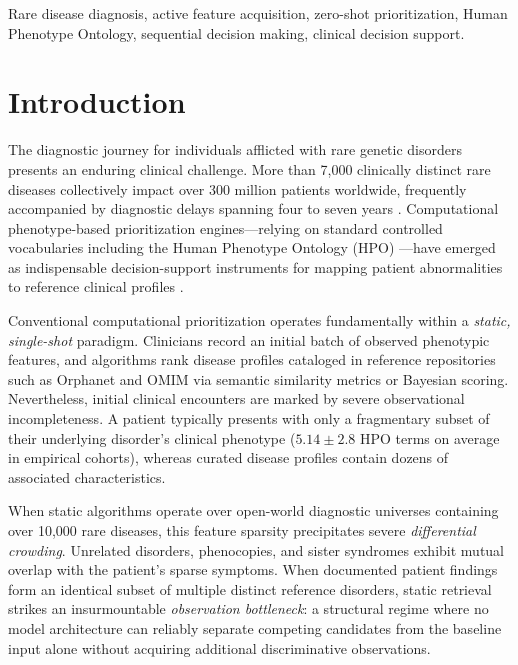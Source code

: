 \documentclass[conference]{IEEEtran}
\begin{document}
\begin{IEEEkeywords}
Rare disease diagnosis, active feature acquisition, zero-shot prioritization, Human Phenotype Ontology, sequential decision making, clinical decision support.
\end{IEEEkeywords}

\section{Introduction}

The diagnostic journey for individuals afflicted with rare genetic disorders presents an enduring clinical challenge. More than 7,000 clinically distinct rare diseases collectively impact over 300 million patients worldwide, frequently accompanied by diagnostic delays spanning four to seven years \cite{boycott2013rare, nguengang2020estimating}. Computational phenotype-based prioritization engines---relying on standard controlled vocabularies including the Human Phenotype Ontology (HPO) \cite{robinson2008human, kohler2021human}---have emerged as indispensable decision-support instruments for mapping patient abnormalities to reference clinical profiles \cite{kohler2009clinical, bauer2012bayesian, robinson2020lirical}.

Conventional computational prioritization operates fundamentally within a \textit{static, single-shot} paradigm. Clinicians record an initial batch of observed phenotypic features, and algorithms rank disease profiles cataloged in reference repositories such as Orphanet \cite{orpha_net} and OMIM \cite{omim_ref} via semantic similarity metrics or Bayesian scoring. Nevertheless, initial clinical encounters are marked by severe observational incompleteness. A patient typically presents with only a fragmentary subset of their underlying disorder's clinical phenotype ($5.14 \pm 2.8$ HPO terms on average in empirical cohorts), whereas curated disease profiles contain dozens of associated characteristics.

When static algorithms operate over open-world diagnostic universes containing over 10,000 rare diseases, this feature sparsity precipitates severe \textit{differential crowding}. Unrelated disorders, phenocopies, and sister syndromes exhibit mutual overlap with the patient's sparse symptoms. When documented patient findings form an identical subset of multiple distinct reference disorders, static retrieval strikes an insurmountable \textit{observation bottleneck}: a structural regime where no model architecture can reliably separate competing candidates from the baseline input alone without acquiring additional discriminative observations.
\end{document}
